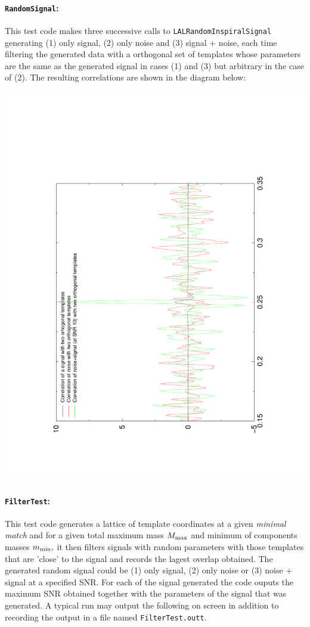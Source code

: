 \paragraph* {\texttt{RandomSignal}:} This test code makes three
successive calls to \texttt{LALRandomInspiralSignal} generating
(1) only signal, (2) only noise and (3) signal + noise, each
time filtering the generated data with a orthogonal set of templates
whose parameters are the same as the generated signal in 
cases (1) and (3) but arbitrary in the case of (2). The resulting
correlations are shown in the diagram below:
\begin{center}
\includegraphics[angle=-90,width=4truein]{RandomSignal.pdf}
\end{center}
\paragraph* {\texttt{FilterTest}:} This test code generates
a lattice of template coordinates at a given {\it minimal match}
and for a given total maximum mass $M_{\rm max}$ and minimum of components
masses $m_{\rm min},$ it then filters signals with random parameters
with those templates that are 'close' to the signal and records
the lagest overlap obtained. The generated random signal could
be (1) only signal, (2) only noise or (3) noise + signal at a specified
SNR. For each of the signal generated the code ouputs the maximum
SNR obtained together with the parameters of the signal that was
generated. A typical run may output the following on screen in 
addition to recording the output in a file named \texttt{FilterTest.outt}.


